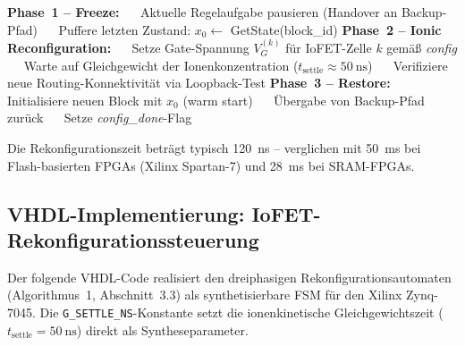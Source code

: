﻿\documentclass[a4paper,12pt]{scrreprt}
\theoremstyle{definition}
\begin{document}
\begin{algorithm}[H]
\caption{IoFET-FPGA Rekonfigurationsprotokoll}
\begin{algorithmic}[1]
  \State \textbf{Phase~1 -- Freeze:}
  \State $\quad$ Aktuelle Regelaufgabe pausieren (Handover an Backup-Pfad)
  \State $\quad$ Puffere letzten Zustand: $x_0 \leftarrow$ GetState(block\_id)
  \State \textbf{Phase~2 -- Ionic Reconfiguration:}
  \State $\quad$ Setze Gate-Spannung $V_G^{(k)}$ für IoFET-Zelle $k$ gemäß \textit{config}
  \State $\quad$ Warte auf Gleichgewicht der Ionenkonzentration ($t_{\text{settle}} \approx \SI{50}{\nano\second}$)
  \State $\quad$ Verifiziere neue Routing-Konnektivität via Loopback-Test
  \State \textbf{Phase~3 -- Restore:}
  \State $\quad$ Initialisiere neuen Block mit $x_0$ (warm start)
  \State $\quad$ Übergabe von Backup-Pfad zurück
  \State $\quad$ Setze \textit{config\_done}-Flag
\EndProcedure
\end{algorithmic}
\end{algorithm}

Die Rekonfigurationszeit beträgt typisch \SI{120}{\nano\second} --
verglichen mit \SI{50}{\milli\second} bei Flash-basierten FPGAs
(Xilinx Spartan-7) und \SI{28}{\milli\second} bei SRAM-FPGAs.

\subsection{VHDL-Implementierung: IoFET-Rekonfigurationssteuerung}

Der folgende VHDL-Code realisiert den dreiphasigen Rekonfigurationsautomaten
(Algorithmus~1, Abschnitt~3.3) als synthetisierbare FSM für den
Xilinx Zynq-7045. Die \texttt{G\_SETTLE\_NS}-Konstante setzt die
ionenkinetische Gleichgewichtszeit ($t_{\text{settle}} = \SI{50}{\nano\second}$)
direkt als Syntheseparameter.
\end{document}
